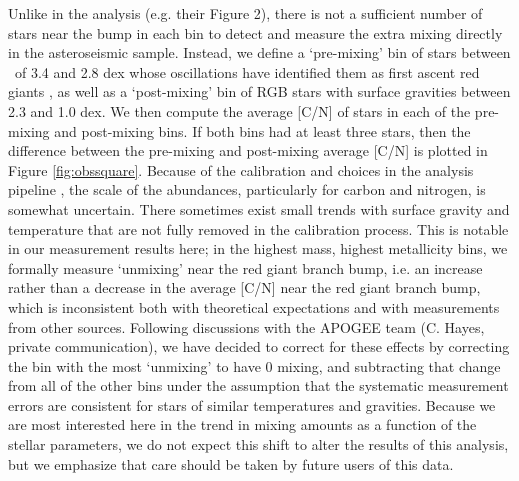 Unlike in the \citet{Shetrone2019} analysis (e.g. their Figure 2), there is not a sufficient number of stars near the bump in each bin to detect and measure the extra mixing directly in the asteroseismic sample. Instead, we define a `pre-mixing' bin of stars between \logg\ of 3.4 and 2.8 dex whose oscillations have identified them as first ascent red giants \citep{Elsworth2019}, as well as a `post-mixing' bin of RGB stars with surface gravities between 2.3 and 1.0 dex. We then compute the average [C/N] of stars in each of the pre-mixing and post-mixing bins. If both bins had at least three stars, then the difference between the pre-mixing and post-mixing average [C/N] is plotted in Figure \ref{fig:obssquare}. Because of the calibration and choices in the analysis pipeline
\citep[see e.g.][]{Holtzman2018,Jonsson2020, vsmith_apogee_dr16_2021}, the scale of the abundances, particularly for carbon and nitrogen, is somewhat uncertain.
There sometimes exist small trends with surface gravity and temperature that are not fully removed in the calibration process. This is notable in our measurement results here; in the highest mass, highest metallicity bins, we formally measure `unmixing' near the red giant branch bump, i.e. an increase rather than a decrease in the average [C/N] near the red giant branch bump, which is inconsistent both with theoretical expectations and with measurements from other sources. Following discussions with the APOGEE team (C. Hayes, private communication), we have decided to correct for these effects by correcting the bin with the most `unmixing' to have 0 mixing, and subtracting that change from all of the other bins under the assumption that the systematic measurement errors are consistent for stars of similar temperatures and gravities. Because we are most interested here in the trend in mixing amounts as a function of the stellar parameters, we do not expect this shift to alter the results of this analysis, but we emphasize that care should be taken by future users of this data. %

